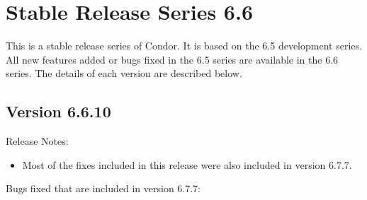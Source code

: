 \section{\label{sec:History-6-6}Stable Release Series 6.6}

This is a stable release series of Condor.
It is based on the 6.5 development series.
All new features added or bugs fixed in the 6.5 series are available
in the 6.6 series.
The details of each version are described below.

\subsection{\label{sec:New-6-6-10}Version 6.6.10}

\noindent Release Notes:

\begin{itemize}

\item Most of the fixes included in this release were also included in
  version 6.7.7.

\end{itemize}

%
%
%

\noindent Bugs fixed that are included in version 6.7.7:

